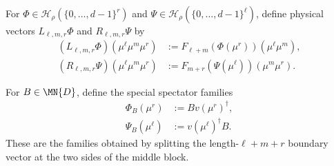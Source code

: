 \begin{definition}
    \label{def:fnw_overlap_families}
    \leanok
    For $\Phi\in\mathscr H_\rho(\{0,\ldots,d-1\}^r)$ and
    $\Psi\in\mathscr H_\rho(\{0,\ldots,d-1\}^\ell)$, define physical
    vectors $L_{\ell,m,r}\Phi$ and $R_{\ell,m,r}\Psi$ by
    \begin{align}
        (L_{\ell,m,r}\Phi)(\mu^\ell\mu^m\mu^r)
         & :=F_{\ell+m}(\Phi(\mu^r))(\mu^\ell\mu^m),
        \label{eq:fnw_left_overlap_family}           \\
        (R_{\ell,m,r}\Psi)(\mu^\ell\mu^m\mu^r)
         & :=F_{m+r}(\Psi(\mu^\ell))(\mu^m\mu^r).
        \label{eq:fnw_right_overlap_family}
    \end{align}
\end{definition}

\begin{definition}
    \label{def:fnw_full_ground_spectator_families}
    \leanok
    For $B\in\MN{D}$, define the special spectator families
    \begin{align}
        \Phi_B(\mu^r)
         & :=Bv(\mu^r)^\dagger,
        \label{eq:fnw_left_full_ground_family} \\
        \Psi_B(\mu^\ell)
         & :=v(\mu^\ell)^\dagger B.
        \label{eq:fnw_right_full_ground_family}
    \end{align}
    These are the families obtained by splitting the length-$\ell+m+r$
    boundary vector at the two sides of the middle block.
\end{definition}


